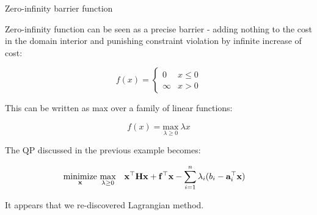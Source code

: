 \documentclass{beamer}
\begin{document}
\begin{frame}{Zero-infinity barrier function}
	\begin{flushleft}
		
		Zero-infinity function can be seen as a precise barrier - adding nothing to the cost in the domain interior and punishing constraint violation by infinite increase of cost:
		
		\begin{equation}
		f(x) = 
		\begin{cases}
			0 &x \leq 0 \\
			\infty &x > 0
		\end{cases}
		\end{equation}
		
		This can be written as max over a family of linear functions:
		
		\begin{equation}
			f(x) = 
			\underset{\lambda \geq 0}{\text{max}}  \  \lambda x
		\end{equation}		
		
		The QP discussed in the previous example becomes:
		
		\begin{equation}
			\begin{aligned}
				& \underset{\bo{x}}{\text{minimize}} \ \underset{\lambda \geq 0}{\text{max}}
				& & \bo{x}^\top \bo{H} \bo{x} + \bo{f}^\top \bo{x} - \sum\limits_{i = 1}^n \lambda_i (b_i - \bo{a}_i^\top \bo{x})
			\end{aligned}
		\end{equation}
		
		It appears that we re-discovered Lagrangian method.
		
		
	\end{flushleft}
\end{frame}
\end{document}
